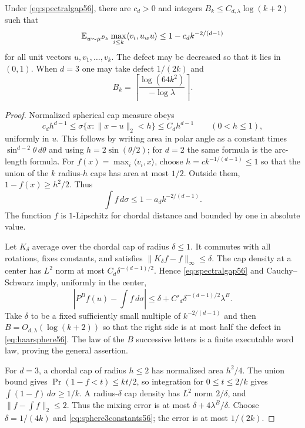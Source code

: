\begin{lemma}\label{lem:sphericalgap56}
Under \eqref{eq:spectralgap56}, there are $c_d>0$ and integers $B_k\le C_{d,\lambda}\log(k+2)$ such that
\[
 \mathbb E_{w\sim\mu^{B_k}}\max_{i\le k}\langle v_i,u_w u\rangle
                  \le1-c_d k^{-2/(d-1)}
\]
for all unit vectors $u,v_1,\ldots,v_k$. The defect may be decreased so that it lies in $(0,1)$. When $d=3$ one may take defect $1/(2k)$ and
\begin{equation}\label{eq:sphere3constants56}
                  B_k=\left\lceil\frac{\log(64k^2)}{-\log\lambda}\right\rceil.
\end{equation}
\end{lemma}
\begin{proof}
Normalized spherical cap measure obeys
\[
       c_d h^{d-1}\le\sigma\{x:\|x-u\|_2<h\}\le C_d h^{d-1}
                     \qquad(0<h\le1),
\]
uniformly in $u$. This follows by writing area in polar angle as a constant times $\sin^{d-2}\theta\,d\theta$ and using $h=2\sin(\theta/2)$; for $d=2$ the same formula is the arc-length formula. For $f(x)=\max_i\langle v_i,x\rangle$, choose $h=c k^{-1/(d-1)}\le1$ so that the union of the $k$ radius-$h$ caps has area at most $1/2$. Outside them, $1-f(x)\ge h^2/2$. Thus
\begin{equation}\label{eq:haarsphere56}
                         \int f\,d\sigma\le1-a_d k^{-2/(d-1)}.
\end{equation}
The function $f$ is $1$-Lipschitz for chordal distance and bounded by one in absolute value.

Let $K_\delta$ average over the chordal cap of radius $\delta\le1$. It commutes with all rotations, fixes constants, and satisfies $\|K_\delta f-f\|_\infty\le\delta$. The cap density at a center has $L^2$ norm at most $C_d\delta^{-(d-1)/2}$. Hence \eqref{eq:spectralgap56} and Cauchy--Schwarz imply, uniformly in the center,
\[
 \left|P^B f(u)-\int f\,d\sigma\right|
 \le\delta+C'_d\delta^{-(d-1)/2}\lambda^B.
\]
Take $\delta$ to be a fixed sufficiently small multiple of $k^{-2/(d-1)}$ and then $B=O_{d,\lambda}(\log(k+2))$ so that the right side is at most half the defect in \eqref{eq:haarsphere56}. The law of the $B$ successive letters is a finite executable word law, proving the general assertion.

For $d=3$, a chordal cap of radius $h\le2$ has normalized area $h^2/4$. The union bound gives $\Pr(1-f<t)\le kt/2$, so integration for $0\le t\le2/k$ gives $\int(1-f)\,d\sigma\ge1/k$. A radius-$\delta$ cap density has $L^2$ norm $2/\delta$, and $\|f-\int f\|_2\le2$. Thus the mixing error is at most $\delta+4\lambda^B/\delta$. Choose $\delta=1/(4k)$ and \eqref{eq:sphere3constants56}; the error is at most $1/(2k)$.
\end{proof}

